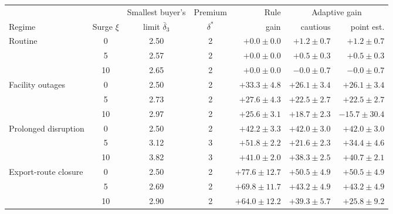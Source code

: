 \begin{tabular}{@{}lcccrrr@{}}
\toprule
 & & Smallest buyer's & Premium & Rule & \multicolumn{2}{c}{Adaptive gain} \\ \cmidrule(lr){6-7}
Regime & Surge $\xi$ & limit $\bar\delta_3$ & $\delta^*$ & gain & cautious & point est. \\
\midrule
Routine & 0 & 2.50 & 2 & $+0.0\pm0.0$ & $+1.2\pm0.7$ & $+1.2\pm0.7$ \\
 & 5 & 2.57 & 2 & $+0.0\pm0.0$ & $+0.5\pm0.3$ & $+0.5\pm0.3$ \\
 & 10 & 2.65 & 2 & $+0.0\pm0.0$ & $-0.0\pm0.7$ & $-0.0\pm0.7$ \\
\addlinespace
Facility outages & 0 & 2.50 & 2 & $+33.3\pm4.8$ & $+26.1\pm3.4$ & $+26.1\pm3.4$ \\
 & 5 & 2.73 & 2 & $+27.6\pm4.3$ & $+22.5\pm2.7$ & $+22.5\pm2.7$ \\
 & 10 & 2.97 & 2 & $+25.6\pm3.1$ & $+18.7\pm2.3$ & $-15.7\pm30.4$ \\
\addlinespace
Prolonged disruption & 0 & 2.50 & 2 & $+42.2\pm3.3$ & $+42.0\pm3.0$ & $+42.0\pm3.0$ \\
 & 5 & 3.12 & 3 & $+51.8\pm2.2$ & $+21.6\pm2.3$ & $+34.4\pm4.6$ \\
 & 10 & 3.82 & 3 & $+41.0\pm2.0$ & $+38.3\pm2.5$ & $+40.7\pm2.1$ \\
\addlinespace
Export-route closure & 0 & 2.50 & 2 & $+77.6\pm12.7$ & $+50.5\pm4.9$ & $+50.5\pm4.9$ \\
 & 5 & 2.69 & 2 & $+69.8\pm11.7$ & $+43.2\pm4.9$ & $+43.2\pm4.9$ \\
 & 10 & 2.90 & 2 & $+64.0\pm12.2$ & $+39.3\pm5.7$ & $+25.8\pm9.2$ \\
\bottomrule
\end{tabular}
